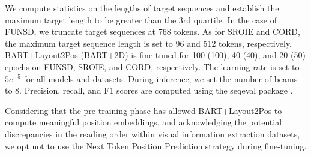 

We compute statistics on the lengths of target sequences and establish the maximum target length to be greater than the 3rd quartile. In the case of FUNSD, we truncate target sequences at 768 tokens. As for SROIE and CORD, the maximum target sequence length is set to 96 and 512 tokens, respectively. BART+Layout2Pos (BART+2D) is fine-tuned for 100 (100), 40 (40), and 20 (50) epochs on FUNSD, SROIE, and CORD, respectively. The learning rate is set to $5e^{-5}$ for all models and datasets. During inference, we set the number of beams to 8. Precision, recall, and F1 scores are computed using the seqeval package \citep{seqeval}. 

Considering that the pre-training phase has allowed BART+Layout2Pos to compute meaningful position embeddings, and acknowledging the potential discrepancies in the reading order within visual information extraction datasets, we opt not to use the Next Token Position Prediction strategy during fine-tuning.




